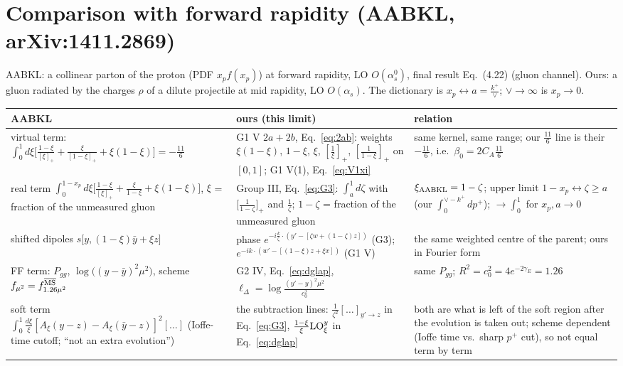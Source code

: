 \documentclass[10pt]{article}
\numberwithin{equation}{section}
\newcommand{\LO}{{\rm LO}}
\newcommand{\MSb}{\overline{\rm MS}}
\begin{document}
\section{Comparison with forward rapidity (AABKL, arXiv:1411.2869)}\label{sec:aabkl}
AABKL: a collinear parton of the proton (PDF $x_pf(x_p)$) at forward rapidity, LO $O(\alpha_s^0)$, final result Eq.~(4.22) (gluon channel). Ours: a gluon radiated by the charges $\rho$ of a dilute projectile at mid rapidity, LO $O(\alpha_s)$. The dictionary is $x_p\leftrightarrow a=\frac{k^+}{\vee}$; $\vee\to\infty$ is $x_p\to0$.
{\small\renewcommand{\arraystretch}{1.35}
\begin{longtable}{@{}>{\raggedright\arraybackslash}p{}>{\raggedright\arraybackslash}p{}>{\raggedright\arraybackslash}p{}@{}}\toprule
AABKL & ours (this limit) & relation\\\midrule
virtual term: $\int_0^1d\xi\big[\frac{1-\xi}{[\xi]_+}+\frac{\xi}{[1-\xi]_+}+\xi(1-\xi)\big]=-\frac{11}{6}$ & G1 V $2a+2b$, Eq.~\eqref{eq:2ab}: weights $\xi(1-\xi)$, $1-\xi$, $\xi$, $[\frac1\xi]_+$, $[\frac1{1-\xi}]_+$ on $[0,1]$; G1 V(1), Eq.~\eqref{eq:V1xi} & same kernel, same range; our $\frac{11}{6}$ line is their $-\frac{11}{6}$, i.e.\ $\beta_0=2C_A\frac{11}{6}$\\
real term $\int_0^{1-x_p}d\xi\big[\frac{1-\xi}{[\xi]_+}+\frac{\xi}{1-\xi}+\xi(1-\xi)\big]$, $\xi$ = fraction of the unmeasured gluon & Group III, Eq.~\eqref{eq:G3}: $\int_{a}^{1}d\zeta$ with $\big[\frac1{1-\zeta}\big]_+$ and $\frac1\zeta$; $1-\zeta$ = fraction of the unmeasured gluon & $\xi_{\rm AABKL}=1-\zeta$; upper limit $1-x_p\leftrightarrow\zeta\ge a$ (our $\int_0^{\vee-k^+}dp^+$); $\to\int_0^1$ for $x_p,a\to0$\\
shifted dipoles $s\big[y,(1-\xi)\bar y+\xi z\big]$ & phase $e^{-i\frac{k}{\zeta}\cdot(y'-[\zeta w+(1-\zeta)z])}$ (G3); $e^{-ik\cdot(w'-[(1-\xi)z+\xi x])}$ (G1 V) & the same weighted centre of the parent; ours in Fourier form\\
FF term: $P_{gg}$, $\log\big((y-\bar y)^2\mu^2\big)$, scheme $f_{\mu^2}=f^{\MSb}_{1.26\mu^2}$ & G2 IV, Eq.~\eqref{eq:dglap}, $\ell_\Delta=\log\frac{(y'-y)^2\mu^2}{c_0^2}$ & same $P_{gg}$; $R^2=c_0^2=4e^{-2\gamma_E}=1.26$\\
soft term $\int_0^1\frac{d\xi}{\xi}[A_\xi(y-z)-A_\xi(\bar y-z)]^2[\dots]$ (Ioffe-time cutoff; ``not an extra evolution'') & the subtraction lines: $\frac{1}{\zeta^2}[\dots]_{y'\to z}$ in Eq.~\eqref{eq:G3}, $\frac{1-\xi}{\xi}\LO^y_\xi$ in Eq.~\eqref{eq:dglap} & both are what is left of the soft region after the evolution is taken out; scheme dependent (Ioffe time vs.\ sharp $p^+$ cut), so not equal term by term\\

\end{longtable}}
\end{document}
